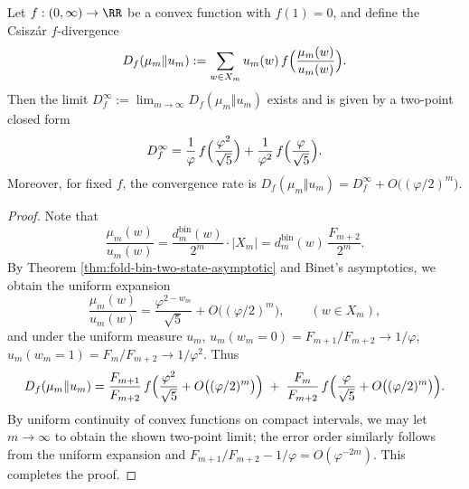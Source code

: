 \begin{proposition}\label{prop:fold-bin-f-divergence-collapse}
Let \(f:(0,\infty)\to\RR\) be a convex function with \(f(1)=0\), and define the Csiszár \(f\)-divergence
\[
D_f(\mu_m\Vert u_m):=\sum_{w\in X_m}u_m(w)\,f\Bigl(\frac{\mu_m(w)}{u_m(w)}\Bigr).
\]
Then the limit \(D_f^\infty:=\lim_{m\to\infty}D_f(\mu_m\Vert u_m)\) exists and is given by a two-point closed form
\[
D_f^\infty=\frac{1}{\varphi}\,f\Bigl(\frac{\varphi^2}{\sqrt5}\Bigr)+\frac{1}{\varphi^2}\,f\Bigl(\frac{\varphi}{\sqrt5}\Bigr).
\]
Moreover, for fixed \(f\), the convergence rate is \(D_f(\mu_m\Vert u_m)=D_f^\infty+O\bigl((\varphi/2)^m\bigr)\).
\end{proposition}

\begin{proof}
Note that
\[
\frac{\mu_m(w)}{u_m(w)}=\frac{d^{\mathrm{bin}}_m(w)}{2^m}\cdot |X_m|
=d^{\mathrm{bin}}_m(w)\,\frac{F_{m+2}}{2^m}.
\]
By Theorem \ref{thm:fold-bin-two-state-asymptotic} and Binet's asymptotics, we obtain the uniform expansion
\[
\frac{\mu_m(w)}{u_m(w)}
=\frac{\varphi^{2-w_m}}{\sqrt5}+O\bigl((\varphi/2)^m\bigr),
\qquad (w\in X_m),
\]
and under the uniform measure \(u_m\),
\(
u_m(w_m=0)=F_{m+1}/F_{m+2}\to 1/\varphi
\),
\(
u_m(w_m=1)=F_m/F_{m+2}\to 1/\varphi^2
\).
Thus
\[
D_f(\mu_m\Vert u_m)
=\frac{F_{m+1}}{F_{m+2}}\,f\Bigl(\frac{\varphi^2}{\sqrt5}+O\bigl((\varphi/2)^m\bigr)\Bigr)
\;+\;\frac{F_m}{F_{m+2}}\,f\Bigl(\frac{\varphi}{\sqrt5}+O\bigl((\varphi/2)^m\bigr)\Bigr).
\]
By uniform continuity of convex functions on compact intervals, we may let \(m\to\infty\) to obtain the shown two-point limit; the error order similarly follows from the uniform expansion and \(F_{m+1}/F_{m+2}-1/\varphi=O(\varphi^{-2m})\). This completes the proof.
\end{proof}

